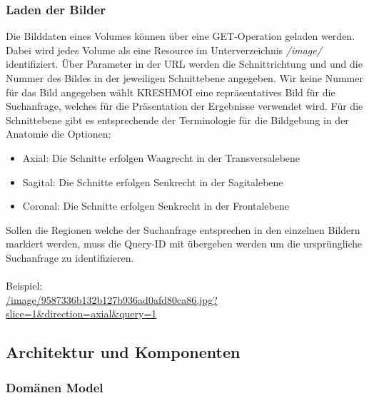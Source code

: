 \subsubsection{Laden der Bilder}
\label{sec:Laden der Bilder}
Die Bilddaten eines Volumes können über eine GET-Operation geladen werden.
Dabei wird jedes Volume als eine Resource im Unterverzeichnis \textit{/image/} identifiziert.
Über Parameter in der URL werden die Schnittrichtung und und die Nummer des Bildes in der jeweiligen Schnittebene angegeben.
Wir keine Nummer für das Bild angegeben wählt KRESHMOI eine repräsentatives Bild für die Suchanfrage, welches für die Präsentation der Ergebnisse verwendet wird.
Für die Schnittebene gibt es entsprechende der Terminologie für die Bildgebung in der Anatomie die Optionen:
\begin{itemize}
	\item Axial: Die Schnitte erfolgen Waagrecht in der Transversalebene
	\item Sagital: Die Schnitte erfolgen Senkrecht in der Sagitalebene
	\item Coronal: Die Schnitte erfolgen Senkrecht in der Frontalebene 
\end{itemize}
Sollen die Regionen welche der Suchanfrage entsprechen in den einzelnen Bildern markiert werden, muss die Query-ID mit übergeben werden um die ursprüngliche Suchanfrage zu identifizieren.
\\
\\
Beispiel:
\\
\url{/image/9587336b132b127b936ad0afd80ca86.jpg?slice=1&direction=axial&query=1}

\subsection{Architektur und Komponenten}
\label{sec:Architektur und Komponenten}

\subsubsection{Domänen Model}
\label{sec:Domänen Model}

